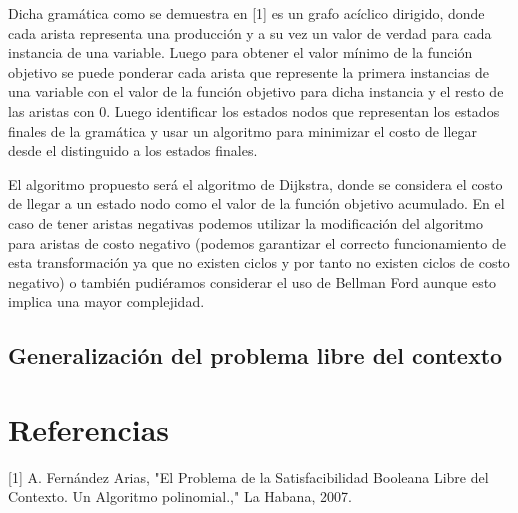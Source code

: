 \documentclass{article}
\begin{document}
Dicha gramática como se demuestra en [1] es un grafo acíclico dirigido, donde cada arista representa una producción y a su vez un valor de verdad
para cada instancia de una variable. Luego para obtener el valor mínimo de la función objetivo se puede ponderar cada arista que represente la primera instancias
de una variable con el valor de la función objetivo para dicha instancia y el resto de las aristas con 0. Luego identificar los estados nodos que representan los estados finales de la gramática 
y usar un algoritmo para minimizar el costo de llegar desde el distinguido a los estados finales.

El algoritmo propuesto será el algoritmo de Dijkstra, donde se considera el costo de llegar a un estado nodo como el valor de la función objetivo acumulado.
En el caso de tener aristas negativas podemos utilizar la modificación del algoritmo para aristas de costo negativo (podemos garantizar el correcto funcionamiento
de esta transformación ya que no existen ciclos y por tanto no existen ciclos de costo negativo) o también pudiéramos considerar el uso de Bellman Ford aunque esto
implica una mayor complejidad.
    
\subsection*{Generalización del problema libre del contexto}


\section*{Referencias}

[1] A. Fernández Arias, "El Problema de la
Satisfacibilidad Booleana Libre del Contexto.
Un Algoritmo polinomial.," La Habana, 2007.
\end{document}
